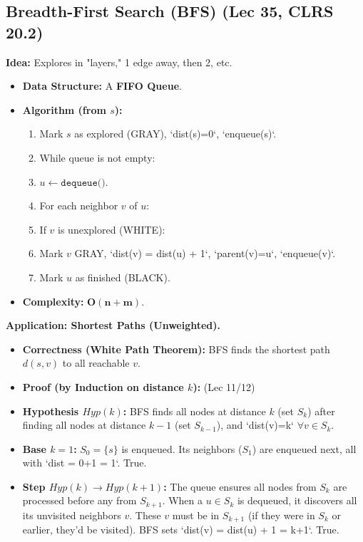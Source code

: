 \subsection{Breadth-First Search (BFS) (Lec 35, CLRS 20.2)}
\textbf{Idea:} Explores in "layers," 1 edge away, then 2, etc.
\begin{itemize}
    \item \textbf{Data Structure:} A \textbf{FIFO Queue}.
    \item \textbf{Algorithm (from $s$):}
    \begin{enumerate}
        \item Mark $s$ as explored (GRAY), `dist(s)=0`, `enqueue(s)`.
        \item While queue is not empty:
        \item $u \gets \texttt{dequeue()}$.
        \item For each neighbor $v$ of $u$:
        \item If $v$ is unexplored (WHITE):
        \item Mark $v$ GRAY, `dist(v) = dist(u) + 1`, `parent(v)=u`, `enqueue(v)`.
        \item Mark $u$ as finished (BLACK).
    \end{enumerate}
    \item \textbf{Complexity:} $\mathbf{O(n+m)}$.
\end{itemize}
\textbf{Application: Shortest Paths (Unweighted).}
\begin{itemize}
    \item \textbf{Correctness (White Path Theorem):} BFS finds the shortest path $d(s,v)$ to all reachable $v$.
    \item \textbf{Proof (by Induction on distance $k$):} (Lec 11/12)
    \item \textbf{Hypothesis $Hyp(k)$:} BFS finds all nodes at distance $k$ (set $S_k$) after finding all nodes at distance $k-1$ (set $S_{k-1}$), and `dist(v)=k` $\forall v \in S_k$.
    \item \textbf{Base $k=1$:} $S_0=\{s\}$ is enqueued. Its neighbors ($S_1$) are enqueued next, all with `dist = 0+1 = 1`. True.
    \item \textbf{Step $Hyp(k) \to Hyp(k+1)$:} The queue ensures all nodes from $S_k$ are processed before any from $S_{k+1}$. When a $u \in S_k$ is dequeued, it discovers all its unvisited neighbors $v$. These $v$ must be in $S_{k+1}$ (if they were in $S_k$ or earlier, they'd be visited). BFS sets `dist(v) = dist(u) + 1 = k+1`. True.
\end{itemize}

